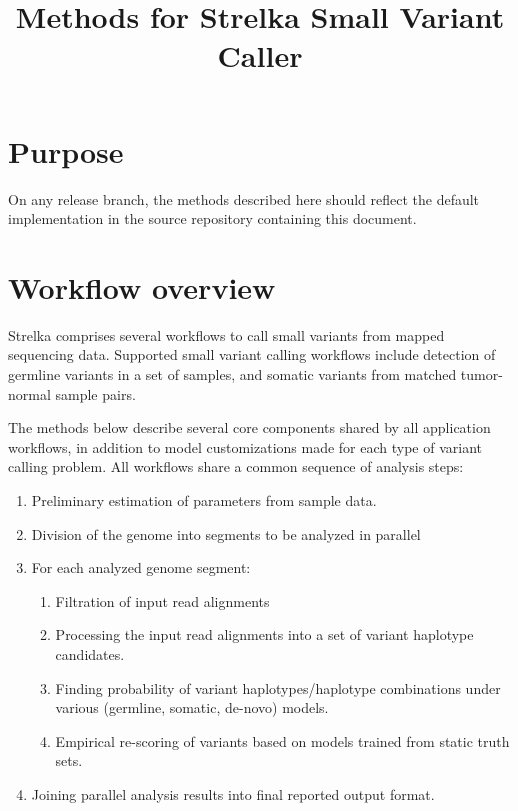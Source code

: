 \documentclass{article}
\title{Methods for Strelka Small Variant Caller}
\begin{document}
\maketitle

\tableofcontents



\section{Purpose}

On any release branch, the methods described here should reflect the default implementation in the source repository containing this document.



\section{Workflow overview}

Strelka comprises several workflows to call small variants from mapped sequencing data. Supported small variant calling workflows include detection of germline variants in a set of samples, and somatic variants from matched tumor-normal sample pairs.

The methods below describe several core components shared by all application workflows, in addition to model customizations made for each type of variant calling problem. All workflows share a common sequence of analysis steps:

\begin{enumerate}
\item Preliminary estimation of parameters from sample data.
\item Division of the genome into segments to be analyzed in parallel
\item For each analyzed genome segment:
\begin{enumerate}
\item Filtration of input read alignments
\item Processing the input read alignments into a set of variant haplotype candidates.
\item Finding probability of variant haplotypes/haplotype combinations under various (germline, somatic, de-novo) models.
\item Empirical re-scoring of variants based on models trained from static truth sets.
\end{enumerate}
\item Joining parallel analysis results into final reported output format.
\end{enumerate}
\end{document}
